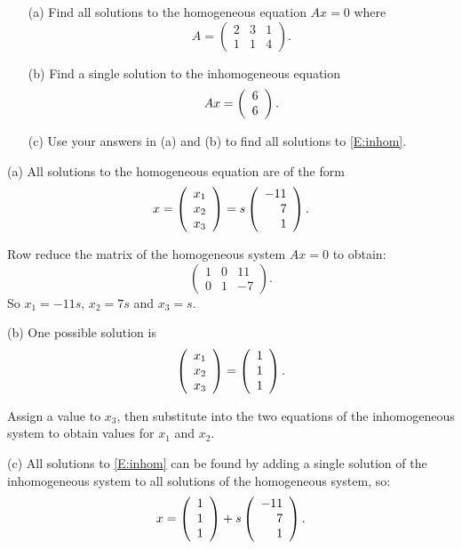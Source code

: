 \documentclass{ximera}
\begin{document}
\begin{exercise} \label{c4.4.3}
\begin{itemize}
\item[(a)] Find all solutions to the homogeneous equation
$Ax=0$ where
\[
A = \left(\begin{array}{ccc} 2 & 3 & 1 \\ 1 & 1 & 4 \end{array}
\right).
\]
\item[(b)] Find a single solution to the inhomogeneous equation
\begin{equation}  \label{E:inhom}
Ax =\left(\begin{array}{r} 6 \\ 6\end{array}\right).
\end{equation}
\item[(c)] Use your answers in (a) and (b) to find all solutions
to \eqref{E:inhom}.
\end{itemize}

\begin{solution}

(a) \ans All solutions to the homogeneous equation are of the form
\[
x = \left(\begin{array}{r} x_1 \\ x_2 \\ x_3\end{array}\right) = s\left(\begin{array}{r} -11 \\ 7 \\ 1\end{array}\right).
\]

\soln Row reduce the matrix of the homogeneous system
$Ax = 0$ to obtain:
\[
\left(\begin{array}{rrr} 1 & 0 & 11 \\ 0 & 1 & -7 \end{array}\right).
\]
So $x_1 = -11s$, $x_2 = 7s$ and $x_3 = s$.

(b) \ans One possible solution is
\[ \left(\begin{array}{r} x_1 \\ x_2 \\ x_3\end{array}\right) = \left(\begin{array}{r} 1 \\ 1 \\ 1\end{array}\right). \]

\soln Assign a value to $x_3$, then substitute into the two equations
of the inhomogeneous system to obtain values for $x_1$ and $x_2$.

(c) All solutions to \eqref{E:inhom} can be found by adding a
single solution of the inhomogeneous system to all solutions
of the homogeneous system, so:
\[
x = \left(\begin{array}{r} 1 \\ 1 \\ 1\end{array}\right) + s\left(\begin{array}{r} -11 \\ 7 \\ 1\end{array}\right).
\]






\end{solution}
\end{exercise}
\end{document}
